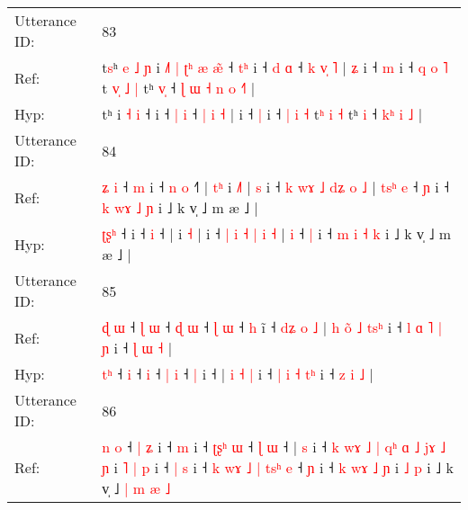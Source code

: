 \documentclass[10pt]{article}
\DeclareRobustCommand{\hl}[1]{{\textcolor{red}{#1}}}
\begin{document}
\begin{longtable}{ll}
\midrule
Utterance ID: & 83 \\
Ref: & t\hl{s}ʰ\hl{ }\hl{e}\hl{ }\hl{˩}\hl{ }\hl{ɲ} i\hl{ }\hl{˩}\hl{˥}\hl{ }\hl{|}\hl{ }\hl{ʈ}\hl{ʰ} \hl{æ} \hl{æ}\hl{̃} ˧\hl{ }\hl{t}\hl{ʰ} i ˧ \hl{d} \hl{ɑ} ˧ \hl{k} \hl{v}\hl{̩} \hl{˥} |\hl{ }\hl{ʑ} i ˧ \hl{m} i ˧ \hl{q} \hl{o} \hl{˥} t\hl{ }\hl{v}\hl{̩} \hl{˩} \hl{|} tʰ \hl{v}\hl{̩} ˧\hl{ }\hl{ɭ}\hl{ }\hl{ɯ} \hl{˧}\hl{ }\hl{n} \hl{o} \hl{˧}\hl{˥} |
 \\
Hyp: & t\hl{}ʰ\hl{}\hl{}\hl{}\hl{}\hl{}\hl{} i\hl{}\hl{}\hl{}\hl{}\hl{}\hl{}\hl{}\hl{} \hl{˧} \hl{}\hl{i} ˧\hl{}\hl{}\hl{} i ˧ \hl{|} \hl{i} ˧ \hl{|} \hl{}\hl{i} \hl{˧} |\hl{}\hl{} i ˧ \hl{|} i ˧ \hl{|} \hl{i} \hl{˧} t\hl{}\hl{}\hl{ʰ} \hl{i} \hl{˧} tʰ \hl{}\hl{i} ˧\hl{}\hl{}\hl{}\hl{} \hl{}\hl{k}\hl{ʰ} \hl{i} \hl{}\hl{˩} |
 \\
\midrule
Utterance ID: & 84 \\
Ref: & \hl{ʑ}\hl{ }\hl{i} ˧\hl{ }\hl{m} i ˧\hl{ }\hl{n} \hl{o} ˧\hl{˥} |\hl{ }\hl{t}\hl{ʰ} i \hl{˩}\hl{˥} |\hl{ }\hl{s} i ˧ \hl{k} \hl{w}\hl{ɤ} \hl{˩} \hl{d}\hl{ʑ} \hl{o} \hl{˩} |\hl{ }\hl{t}\hl{s}\hl{ʰ} \hl{e} ˧ \hl{ɲ} i ˧ \hl{k} \hl{w}\hl{ɤ} \hl{˩} \hl{ɲ} i ˩ k v̩ ˩ m æ ˩ |
 \\
Hyp: & \hl{ʈ}\hl{ʂ}\hl{ʰ} ˧\hl{}\hl{} i ˧\hl{}\hl{} \hl{i} ˧\hl{} |\hl{}\hl{}\hl{} i \hl{}\hl{˧} |\hl{}\hl{} i ˧ \hl{|} \hl{}\hl{i} \hl{˧} \hl{}\hl{|} \hl{i} \hl{˧} |\hl{}\hl{}\hl{}\hl{} \hl{i} ˧ \hl{|} i ˧ \hl{m} \hl{}\hl{i} \hl{˧} \hl{k} i ˩ k v̩ ˩ m æ ˩ |
 \\
\midrule
Utterance ID: & 85 \\
Ref: & \hl{ɖ}\hl{ }\hl{ɯ} ˧\hl{ }\hl{ɭ} \hl{ɯ} ˧\hl{ }\hl{ɖ} \hl{ɯ} ˧ \hl{ɭ} \hl{ɯ} ˧ \hl{h} i\hl{̃} ˧\hl{ }\hl{d}\hl{ʑ}\hl{ }\hl{o}\hl{ }\hl{˩} |\hl{ }\hl{h} \hl{o}\hl{̃} \hl{˩} \hl{t}\hl{s}\hl{ʰ} i ˧ \hl{l} \hl{ɑ} \hl{˥} \hl{|}\hl{ }\hl{ɲ} i ˧ \hl{ɭ} \hl{ɯ} \hl{˧} |
 \\
Hyp: & \hl{}\hl{t}\hl{ʰ} ˧\hl{}\hl{} \hl{i} ˧\hl{}\hl{} \hl{i} ˧ \hl{|} \hl{i} ˧ \hl{|} i\hl{} ˧\hl{}\hl{}\hl{}\hl{}\hl{}\hl{}\hl{} |\hl{}\hl{} \hl{}\hl{i} \hl{˧} \hl{}\hl{}\hl{|} i ˧ \hl{|} \hl{i} \hl{˧} \hl{}\hl{t}\hl{ʰ} i ˧ \hl{z} \hl{i} \hl{˩} |
 \\
\midrule
Utterance ID: & 86 \\
Ref: & \hl{n}\hl{ }\hl{o} ˧\hl{ }\hl{|}\hl{ }\hl{ʑ} i ˧\hl{ }\hl{m} i ˧ \hl{ʈ}\hl{ʂ}\hl{ʰ} \hl{ɯ} ˧ \hl{ɭ} \hl{ɯ} ˧ |\hl{ }\hl{s} i ˧\hl{ }\hl{k} \hl{w}\hl{ɤ}\hl{ }\hl{˩} \hl{|} \hl{q}\hl{ʰ} \hl{ɑ} \hl{˩} \hl{j}\hl{ɤ} \hl{˩}\hl{ }\hl{ɲ} i\hl{ }\hl{˥} \hl{|} \hl{p} i ˧\hl{ }\hl{|} \hl{s} i ˧\hl{ }\hl{k} \hl{w}\hl{ɤ} \hl{˩} \hl{|} \hl{t}\hl{s}\hl{ʰ} \hl{e} ˧ \hl{ɲ} i ˧ \hl{k} \hl{w}\hl{ɤ} \hl{˩} \hl{ɲ} i \hl{˩} \hl{p} i ˩ k v̩ ˩ \hl{|} \hl{m} \hl{æ} \hl{˩}

\end{longtable}
\end{document}
